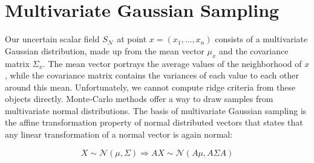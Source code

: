 \section{Multivariate Gaussian Sampling}\label{sec:MGS}

Our uncertain scalar field $S_{\mathcal{N}}$ at point
$x=(x_1,\dots,x_n)$ consists of a multivariate Gaussian distribution,
made up from the mean vector $\mu_x$ and the covariance matrix
$\Sigma_x$. The mean vector portrays the average values of the
neighborhood of $x$, while the covariance matrix contains the variances
of each value to each other around this mean. Unfortunately, we cannot
compute ridge criteria from these objects directly. Monte-Carlo methods
offer a way to draw samples from multivariate normal distributions. The
basis of multivariate Gaussian sampling is the affine transformation
property of normal distributed vectors that states that any linear
transformation of a normal vector is again normal:

\begin{equation}
    X \sim \mathcal{N}(\mu,\Sigma) \Rightarrow AX \sim \mathcal{N}(A\mu, A\Sigma A)
\end{equation}

